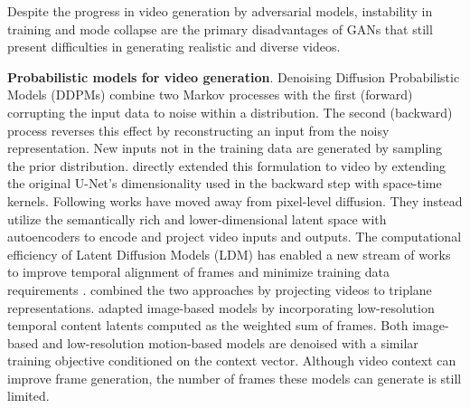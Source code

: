 
Despite the progress in video generation by adversarial models, instability in training and mode collapse are the primary disadvantages of GANs that still present difficulties in generating realistic and diverse videos. 


\noindent
\textbf{Probabilistic models for video generation}. Denoising Diffusion Probabilistic Models (DDPMs) \citep{ho2020denoising,sohl2015deep,song2019generative} combine two Markov processes with the first (forward) corrupting the input data to noise within a distribution. The second (backward) process reverses this effect by reconstructing an input from the noisy representation. New inputs not in the training data are generated by sampling the prior distribution. \citet{ho2022video} directly extended this formulation to video by extending the original U-Net's \citep{salimans2017pixelcnn++} dimensionality used in the backward step with space-time kernels. Following works \citep{he2022latent,hong2022cogvideo,blattmann2023align} have moved away from pixel-level diffusion. They instead utilize the semantically rich and lower-dimensional latent space \citep{rombach2022high} with autoencoders to encode and project video inputs and outputs. The computational efficiency of Latent Diffusion Models (LDM) has enabled a new stream of works to improve temporal alignment of frames \citep{blattmann2023align,yang2023video} and minimize training data requirements \citep{nikankin2023sinfusion,wu2023tune}. \citet{yu2023avideo} combined the two approaches by projecting videos to triplane representations. \citet{yu2024efficient} adapted image-based models by incorporating low-resolution temporal content latents computed as the weighted sum of frames. Both image-based and low-resolution motion-based models are denoised with a similar training objective conditioned on the context vector. Although video context can improve frame generation, the number of frames these models can generate is still limited. 


